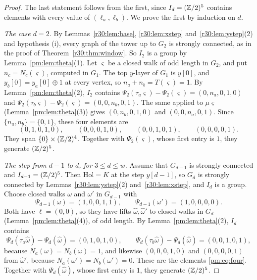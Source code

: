 \begin{proof}
The last statement follows from the first, since $I_d=(\mathbb{Z}/2)^5$ contains elements with every value of $(\ell_a,\ell_b)$. We prove the first by induction on $d$.

\emph{The case $d=2$.} By Lemmas~\ref{r30:lem:base}, \ref{r30:lem:xstep} and~\ref{r30:lem:ystep}(2) and hypothesis (i), every graph of the tower up to $G_2$ is strongly connected, as in the proof of Theorem~\ref{r30:thm:window}. So $I_2$ is a group by Lemma~\ref{pm:lem:theta}(1). Let $\varsigma$ be a closed walk of odd length in $G_2$, and put $n_c=N_c(\bar\varsigma)$, computed in $G_1$. The top $y$-layer of $G_1$ is $y[0]$, and $y_b[0]=y_a[0]\oplus1$ at every vertex, so $n_a+n_b=T(\varsigma)=1$. By Lemma~\ref{pm:lem:theta}(2), $I_2$ contains $\Psi_2(\tau_a\varsigma)-\Psi_2(\varsigma)=(0,n_a,0,1,0)$ and $\Psi_2(\tau_b\varsigma)-\Psi_2(\varsigma)=(0,0,n_b,0,1)$. The same applied to $\mu\varsigma$ (Lemma~\ref{pm:lem:theta}(3)) gives $(0,n_b,0,1,0)$ and $(0,0,n_a,0,1)$. Since $\{n_a,n_b\}=\{0,1\}$, these four elements are
\begin{equation}\label{pm:eq:four}
(0,1,0,1,0),\qquad(0,0,0,1,0),\qquad(0,0,1,0,1),\qquad(0,0,0,0,1).
\end{equation}
They span $\{0\}\times(\mathbb{Z}/2)^4$. Together with $\Psi_2(\varsigma)$, whose first entry is $1$, they generate $(\mathbb{Z}/2)^5$.

\emph{The step from $d-1$ to $d$, for $3\le d\le w$.} Assume that $G_{d-1}$ is strongly connected and $I_{d-1}=(\mathbb{Z}/2)^5$. Then $\mathrm{Hol}=K$ at the step $y[d-1]$, so $G_d$ is strongly connected by Lemmas~\ref{r30:lem:ystep}(2) and~\ref{r30:lem:xstep}, and $I_d$ is a group. Choose closed walks $\omega$ and $\omega'$ in $G_{d-1}$ with
\[
\Psi_{d-1}(\omega)=(1,0,0,1,1),\qquad\Psi_{d-1}(\omega')=(1,0,0,0,0).
\]
Both have $\ell=(0,0)$, so they have lifts $\hat\omega,\hat\omega'$ to closed walks in $G_d$ (Lemma~\ref{pm:lem:theta}(4)), of odd length. By Lemma~\ref{pm:lem:theta}(2), $I_d$ contains
\[
\Psi_d(\tau_a\hat\omega)-\Psi_d(\hat\omega)=(0,1,0,1,0),\qquad\Psi_d(\tau_b\hat\omega)-\Psi_d(\hat\omega)=(0,0,1,0,1),
\]
because $N_a(\omega)=N_b(\omega)=1$, and likewise $(0,0,0,1,0)$ and $(0,0,0,0,1)$ from $\hat\omega'$, because $N_a(\omega')=N_b(\omega')=0$. These are the elements \eqref{pm:eq:four}. Together with $\Psi_d(\hat\omega)$, whose first entry is $1$, they generate $(\mathbb{Z}/2)^5$.
\end{proof}

